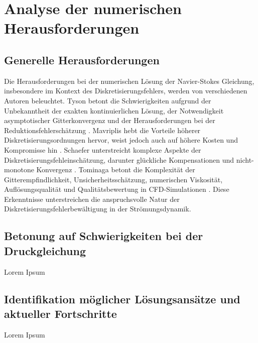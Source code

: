 \section{Analyse der numerischen Herausforderungen}

\subsection{Generelle Herausforderungen}
Die Herausforderungen bei der numerischen Lösung der Navier-Stokes Gleichung, insbesondere im Kontext des Diskretisierungsfehlers, werden von verschiedenen Autoren beleuchtet. Tyson betont die Schwierigkeiten aufgrund der Unbekanntheit der exakten kontinuierlichen Lösung, der Notwendigkeit asymptotischer Gitterkonvergenz und der Herausforderungen bei der Reduktionsfehlerschätzung \parencite{tysonHigherorderErrorEstimation2019}. Mavriplis hebt die Vorteile höherer Diskretisierungsordnungen hervor, weist jedoch auch auf höhere Kosten und Kompromisse hin \parencite{mavriplisProgressCFDDiscretizations2019}. Schaefer unterstreicht komplexe Aspekte der Diskretisierungsfehleinschätzung, darunter glückliche Kompensationen und nicht-monotone Konvergenz \parencite{schaeferApplicationCFDUncertainty2019}. Tominaga betont die Komplexität der Gitterempfindlichkeit, Unsicherheitsschätzung, numerischen Viskosität, Auflösungsqualität und Qualitätsbewertung in CFD-Simulationen \parencite{tominagaAccuracyCFDSimulations2023}. Diese Erkenntnisse unterstreichen die anspruchsvolle Natur der Diskretisierungsfehlerbewältigung in der Strömungsdynamik.

\subsection{Betonung auf Schwierigkeiten bei der Druckgleichung}
Lorem Ipsum

\subsection{Identifikation möglicher Lösungsansätze und aktueller Fortschritte}
Lorem Ipsum